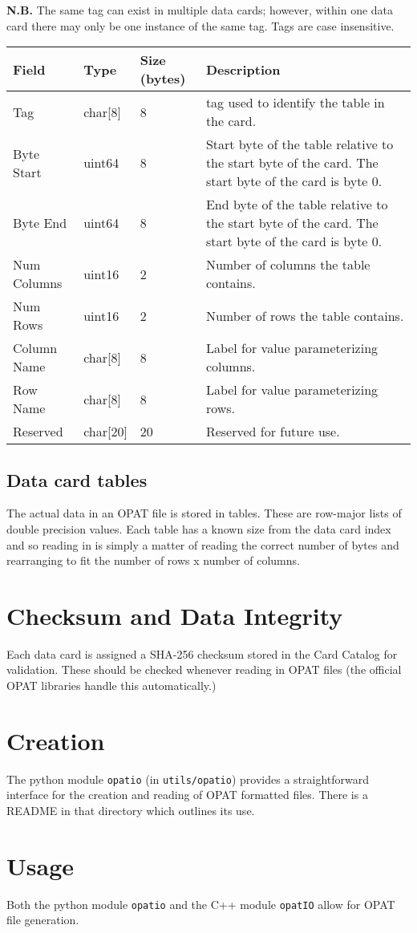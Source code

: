 \documentclass{article}
\begin{document}
\noindent\textbf{N.B.} The same tag can exist in multiple data cards;  however,
within one data card there may only be one instance of the same tag.  Tags are
case insensitive. 
\begin{longtable}{|l|l|l|p{5cm}|}
\hline
\textbf{Field} & \textbf{Type} & \textbf{Size (bytes)} & \textbf{Description} \\
\hline
  Tag & char[8] & 8 & tag used to identify the table in the card.  \\
  Byte Start & uint64 & 8 & Start byte of the table relative to the start byte of the card.  The start byte of the card is byte 0.  \\
  Byte End & uint64 & 8 & End byte of the table relative to the start byte of the card.  The start byte of the card is byte 0.  \\
  Num Columns & uint16 & 2 & Number of columns the table contains.  \\
  Num Rows & uint16 & 2 & Number of rows the table contains.  \\
  Column Name & char[8] & 8 & Label for value parameterizing columns.  \\
  Row Name & char[8] & 8 & Label for value parameterizing rows.  \\
  Reserved & char[20] & 20 & Reserved for future use.  \\
\hline
\end{longtable}

\subsection{Data card tables}
The actual data in an OPAT file is stored in tables.  These are row-major lists
of double precision values.  Each table has a known size from the data card
index and so reading in is simply a matter of reading the correct number of
bytes and rearranging to fit the number of rows x number of columns. 

\section{Checksum and Data Integrity}
Each data card is assigned a SHA-256 checksum stored in the Card Catalog for
validation.  These should be checked whenever reading in OPAT files (the
official OPAT libraries handle this automatically.) 

\section{Creation}
The python module \texttt{opatio} (in \texttt{utils/opatio}) provides
a straightforward interface for the creation and reading of OPAT formatted
files.  There is a README in that directory which outlines its use. 

\section{Usage}
Both the python module \texttt{opatio} and the C++ module \texttt{opatIO} allow for OPAT file generation. 
\end{document}
